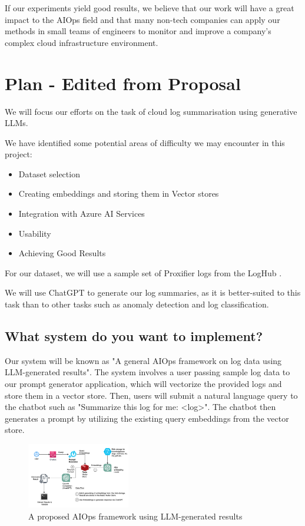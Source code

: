 \documentclass[conference]{IEEEtran}
\begin{document}
If our experiments yield good results, we believe that our work will have a great impact to the AIOps field and that many non-tech companies can apply our methods in small teams of engineers to monitor and improve a company's complex cloud infrastructure environment.

\section{Plan - Edited from Proposal}
We will focus our efforts on the task of cloud log summarisation using generative LLMs.

We have identified some potential areas of difficulty we may encounter in this project:
\begin{itemize}
    \item Dataset selection
    \item Creating embeddings and storing them in Vector stores
    \item Integration with Azure AI Services
    \item Usability
    \item Achieving Good Results
\end{itemize}

For our dataset, we will use a sample set of Proxifier logs from the LogHub \cite{zhu2023loghub}.

We will use ChatGPT to generate our log summaries, as it is better-suited to this task than to other tasks such as anomaly detection and log classification.

\subsection{What system do you want to implement?}
Our system will be known as "A general AIOps framework on log data using LLM-generated results". The system involves a user passing sample log data to our prompt generator application, which will vectorize the provided logs and store them in a vector store. Then, users will submit a natural language query to the chatbot such as "Summarize this log for me: <log>". The chatbot then generates a prompt by utilizing the existing query embeddings from the vector store.

\begin{figure}[ht]
    \centering
    \includegraphics[width=0.4\textwidth]{arch.png}
    \caption{A proposed AIOps framework using LLM-generated results}
    \label{fig:arch}
\end{figure} 
\end{document}

